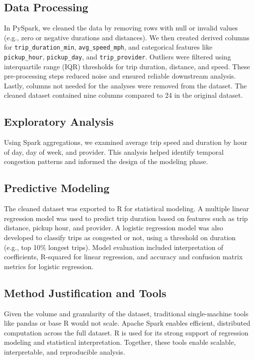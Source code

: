 \documentclass{article}
\begin{document}
\subsection{Data Processing}
In PySpark, we cleaned the data by removing rows with null or invalid values (e.g., zero or negative durations and distances). We then created derived columns for \texttt{trip\_duration\_min}, \texttt{avg\_speed\_mph}, and categorical features like \texttt{pickup\_hour}, \texttt{pickup\_day}, and \texttt{trip\_provider}. Outliers were filtered using interquartile range (IQR) thresholds for trip duration, distance, and speed. These pre-processing steps reduced noise and ensured reliable downstream analysis. Lastly, columns not needed for the analyses were removed from the dataset. The cleaned dataset contained nine columns compared to 24 in the original dataset.

\subsection{Exploratory Analysis}
Using Spark aggregations, we examined average trip speed and duration by hour of day, day of week, and provider. This analysis helped identify temporal congestion patterns and informed the design of the modeling phase.

\subsection{Predictive Modeling}
The cleaned dataset was exported to R for statistical modeling. A multiple linear regression model was used to predict trip duration based on features such as trip distance, pickup hour, and provider. A logistic regression model was also developed to classify trips as congested or not, using a threshold on duration (e.g., top 10\% longest trips). Model evaluation included interpretation of coefficients, R-squared for linear regression, and accuracy and confusion matrix metrics for logistic regression.

\subsection{Method Justification and Tools}
Given the volume and granularity of the dataset, traditional single-machine tools like pandas or base R would not scale. Apache Spark enables efficient, distributed computation across the full dataset. R is used for its strong support of regression modeling and statistical interpretation. Together, these tools enable scalable, interpretable, and reproducible analysis.
\end{document}
